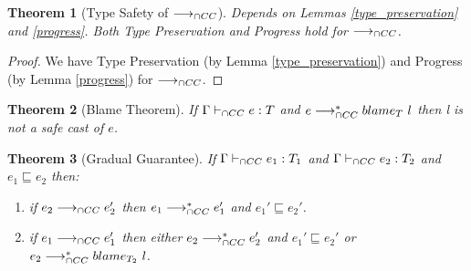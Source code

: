 \documentclass[a4paper]{article}
\newtheorem{theorem}{Theorem}[section]
\begin{document}
\begin{theorem}[Type Safety of $\longrightarrow_{\cap CC}$]
\label{type_safety}
Depends on Lemmas \ref{type_preservation} and \ref{progress}.
Both Type Preservation and Progress hold for $\longrightarrow_{\cap CC}$.
\end{theorem}
\begin{proof}
We have Type Preservation (by Lemma \ref{type_preservation}) and Progress (by Lemma \ref{progress}) for $\longrightarrow_{\cap CC}$.
\end{proof}

\begin{theorem}[Blame Theorem]
\label{blame_theorem}
If $\Gamma \vdash_{\cap CC} e : T$ and $e \longrightarrow_{\cap CC}^* blame_{T}\ l$ then l is not a safe cast of $e$.
\end{theorem}

\begin{theorem}[Gradual Guarantee]
\label{gradual_guarantee}
If $\Gamma \vdash_{\cap CC} e_1 : T_1$ and $\Gamma \vdash_{\cap CC} e_2 : T_2$ and $e_1 \sqsubseteq e_2$ then:
\begin{enumerate}
    \item if $e_2 \longrightarrow_{\cap CC} e_2'$ then $e_1 \longrightarrow_{\cap CC}^* e_1'$ and $e_1' \sqsubseteq e_2'$.
    \item if $e_1 \longrightarrow_{\cap CC} e_1'$ then either $e_2 \longrightarrow_{\cap CC}^* e_2'$ and $e_1' \sqsubseteq e_2'$ or $e_2 \longrightarrow_{\cap CC}^* blame_{T_2}\ l$.
\end{enumerate}
\end{theorem}



\end{document}
